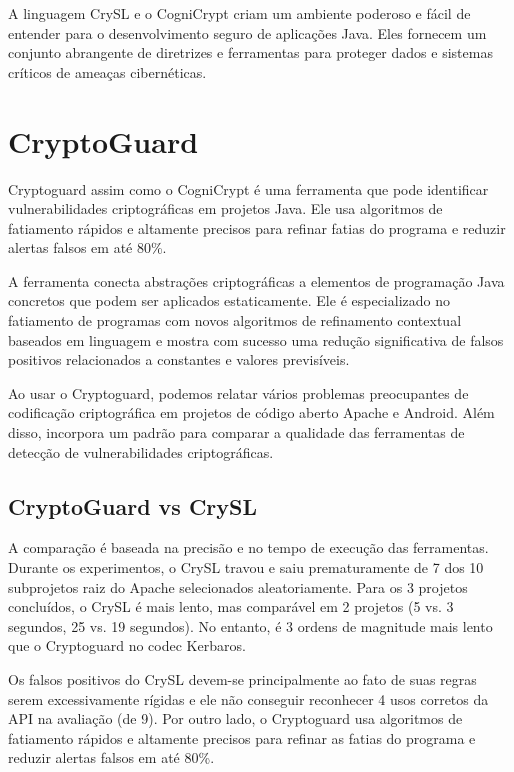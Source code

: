A linguagem CrySL e o CogniCrypt criam um ambiente poderoso e fácil de entender para o desenvolvimento seguro de aplicações Java. Eles fornecem um conjunto abrangente de diretrizes e ferramentas para proteger dados e sistemas críticos de ameaças cibernéticas.

\section{CryptoGuard} %

Cryptoguard assim como o CogniCrypt é uma ferramenta que pode identificar vulnerabilidades criptográficas em projetos Java. Ele usa algoritmos de fatiamento rápidos e altamente precisos para refinar fatias do programa e reduzir alertas falsos em até 80\%. 

A ferramenta conecta abstrações criptográficas a elementos de programação Java concretos que podem ser aplicados estaticamente. Ele é especializado no fatiamento de programas com novos algoritmos de refinamento contextual baseados em linguagem e mostra com sucesso uma redução significativa de falsos positivos relacionados a constantes e valores previsíveis. 

Ao usar o Cryptoguard, podemos relatar vários problemas preocupantes de codificação criptográfica em projetos de código aberto Apache e Android. Além disso, incorpora um padrão para comparar a qualidade das ferramentas de detecção de vulnerabilidades criptográficas.

\subsection{CryptoGuard vs CrySL} %

A comparação é baseada na precisão e no tempo de execução das ferramentas. Durante os experimentos, o CrySL travou e saiu prematuramente de 7 dos 10 subprojetos raiz do Apache selecionados aleatoriamente. Para os 3 projetos concluídos, o CrySL é mais lento, mas comparável em 2 projetos (5 vs. 3 segundos, 25 vs. 19 segundos). No entanto, é 3 ordens de magnitude mais lento que o Cryptoguard no codec Kerbaros. 

Os falsos positivos do CrySL devem-se principalmente ao fato de suas regras serem excessivamente rígidas e ele não conseguir reconhecer 4 usos corretos da API na avaliação (de 9). Por outro lado, o Cryptoguard usa algoritmos de fatiamento rápidos e altamente precisos para refinar as fatias do programa e reduzir alertas falsos em até 80\%. 

